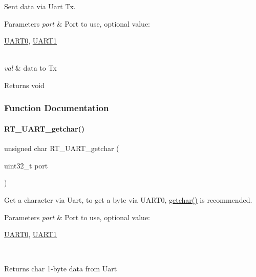 Sent data via Uart Tx. 


\begin{DoxyParams}{Parameters}
{\em port} & Port to use, optional value\+:
\begin{DoxyCode}
\mbox{\hyperlink{a00098_a0508661f121639ffdee7de2353a0def2}{UART0}}, \mbox{\hyperlink{a00098_a8d69bf04d07af4fbbab5a8bd291f65ff}{UART1}}
\end{DoxyCode}
 \\
\hline
{\em val} & data to Tx \\
\hline
\end{DoxyParams}
\begin{DoxyReturn}{Returns}
void 
\end{DoxyReturn}


\subsubsection{Function Documentation}
\mbox{\label{a00098_abc136df9d66fe27bf8ffcc319246591e}} 
\paragraph{\texorpdfstring{R\+T\+\_\+\+U\+A\+R\+T\+\_\+getchar()}{RT\_UART\_getchar()}}
{\footnotesize\ttfamily unsigned char R\+T\+\_\+\+U\+A\+R\+T\+\_\+getchar (\begin{DoxyParamCaption}\item[{uint32\+\_\+t}]{port }\end{DoxyParamCaption})}



Get a character via Uart, to get a byte via U\+A\+R\+T0, \mbox{\hyperlink{a00044_a0979671914792955a7a68461634ff82d}{getchar()}} is recommended. 


\begin{DoxyParams}{Parameters}
{\em port} & Port to use, optional value\+:
\begin{DoxyCode}
\mbox{\hyperlink{a00098_a0508661f121639ffdee7de2353a0def2}{UART0}}, \mbox{\hyperlink{a00098_a8d69bf04d07af4fbbab5a8bd291f65ff}{UART1}}
\end{DoxyCode}
 \\
\hline
\end{DoxyParams}
\begin{DoxyReturn}{Returns}
char 1-\/byte data from Uart 
\end{DoxyReturn}
\mbox{\label{a00098_ab0faf051e642e540b1b9c114eae242bd}} 
